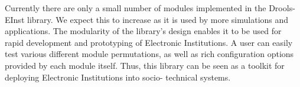 Currently there are only a small number of modules implemented in the Drools-
EInst library. We expect this to increase as it is used by more simulations
and applications. The modularity of the library's design enables it to be used
for rapid development and prototyping of Electronic Institutions. A user can
easily test various different module permutations, as well as rich
configuration options provided by each module itself. Thus, this library can
be seen as a toolkit for deploying Electronic Institutions into socio-
technical systems.






